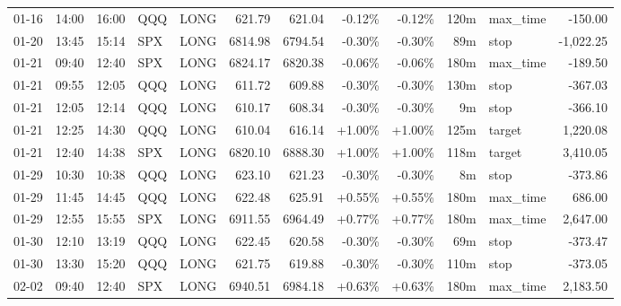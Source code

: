 \documentclass[11pt,a4paper,twoside]{article}
\begin{document}
\begin{center}
\begin{longtable}{>{\color{txtmain}}l l l l l r r r r r >{\color{txtmain}}l r}
01-16 & 14:00 & 16:00 & QQQ & LONG & 621.79 & 621.04 & \textcolor{lossred}{-0.12\%} & \textcolor{lossred}{-0.12\%} & 120m & max\_time & \textcolor{lossred}{-150.00} \\
01-20 & 13:45 & 15:14 & SPX & LONG & 6814.98 & 6794.54 & \textcolor{lossred}{-0.30\%} & \textcolor{lossred}{-0.30\%} & 89m & stop & \textcolor{lossred}{-1,022.25} \\
01-21 & 09:40 & 12:40 & SPX & LONG & 6824.17 & 6820.38 & \textcolor{lossred}{-0.06\%} & \textcolor{lossred}{-0.06\%} & 180m & max\_time & \textcolor{lossred}{-189.50} \\
01-21 & 09:55 & 12:05 & QQQ & LONG & 611.72 & 609.88 & \textcolor{lossred}{-0.30\%} & \textcolor{lossred}{-0.30\%} & 130m & stop & \textcolor{lossred}{-367.03} \\
01-21 & 12:05 & 12:14 & QQQ & LONG & 610.17 & 608.34 & \textcolor{lossred}{-0.30\%} & \textcolor{lossred}{-0.30\%} & 9m & stop & \textcolor{lossred}{-366.10} \\
01-21 & 12:25 & 14:30 & QQQ & LONG & 610.04 & 616.14 & \textcolor{wingreen}{+1.00\%} & \textcolor{wingreen}{+1.00\%} & 125m & target & \textcolor{wingreen}{1,220.08} \\
01-21 & 12:40 & 14:38 & SPX & LONG & 6820.10 & 6888.30 & \textcolor{wingreen}{+1.00\%} & \textcolor{wingreen}{+1.00\%} & 118m & target & \textcolor{wingreen}{3,410.05} \\
01-29 & 10:30 & 10:38 & QQQ & LONG & 623.10 & 621.23 & \textcolor{lossred}{-0.30\%} & \textcolor{lossred}{-0.30\%} & 8m & stop & \textcolor{lossred}{-373.86} \\
01-29 & 11:45 & 14:45 & QQQ & LONG & 622.48 & 625.91 & \textcolor{wingreen}{+0.55\%} & \textcolor{wingreen}{+0.55\%} & 180m & max\_time & \textcolor{wingreen}{686.00} \\
01-29 & 12:55 & 15:55 & SPX & LONG & 6911.55 & 6964.49 & \textcolor{wingreen}{+0.77\%} & \textcolor{wingreen}{+0.77\%} & 180m & max\_time & \textcolor{wingreen}{2,647.00} \\
01-30 & 12:10 & 13:19 & QQQ & LONG & 622.45 & 620.58 & \textcolor{lossred}{-0.30\%} & \textcolor{lossred}{-0.30\%} & 69m & stop & \textcolor{lossred}{-373.47} \\
01-30 & 13:30 & 15:20 & QQQ & LONG & 621.75 & 619.88 & \textcolor{lossred}{-0.30\%} & \textcolor{lossred}{-0.30\%} & 110m & stop & \textcolor{lossred}{-373.05} \\
02-02 & 09:40 & 12:40 & SPX & LONG & 6940.51 & 6984.18 & \textcolor{wingreen}{+0.63\%} & \textcolor{wingreen}{+0.63\%} & 180m & max\_time & \textcolor{wingreen}{2,183.50} \\

\end{longtable}
\end{center}
\end{document}
